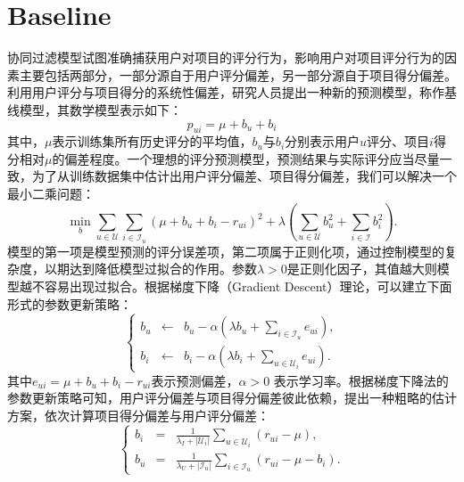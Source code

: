 \section{Baseline}
协同过滤模型试图准确捕获用户对项目的评分行为，影响用户对项目评分行为的因素主要包括两部分，一部分源自于用户评分偏差，另一部分源自于项目得分偏差。利用用户评分与项目得分的系统性偏差，研究人员提出一种新的预测模型，称作基线模型\cite{koren2008factorization,koren2009bellkor,koren2011advances}，其数学模型表示如下：
\begin{equation}\label{eq:baseline}
    p_{ui} = \mu + b_u + b_i
\end{equation}
其中，$\mu$表示训练集所有历史评分的平均值，$b_u$与$b_i$分别表示用户$u$评分、项目$i$得分相对$\mu$的偏差程度。一个理想的评分预测模型，预测结果与实际评分应当尽量一致，为了从训练数据集中估计出用户评分偏差、项目得分偏差，我们可以解决一个最小二乘问题：
\begin{equation}
    \min\limits_{b} \sum\limits_{u\in \mathcal U}\sum\limits_{i\in \mathcal I_u} (\mu + b_u + b_i - r_{ui})^2 + \lambda (\sum\limits_{u\in \mathcal U} b_u^2 + \sum\limits_{i\in \mathcal I} b_i^2).
\end{equation}
模型的第一项是模型预测的评分误差项，第二项属于正则化项，通过控制模型的复杂度，以期达到降低模型过拟合的作用。参数$\lambda>0$是正则化因子，其值越大则模型越不容易出现过拟合。根据梯度下降（Gradient Descent）理论，可以建立下面形式的参数更新策略：
\begin{equation}
    \left\{
        \begin{array}{lcl}
            b_u & \leftarrow & b_u - \alpha (\lambda b_u + \sum\limits_{i\in \mathcal I_u} e_{ui}),\\
            b_i & \leftarrow & b_i - \alpha (\lambda b_i + \sum\limits_{u\in \mathcal U_i} e_{ui}).
        \end{array}
    \right.
\end{equation}
其中$e_{ui}=\mu + b_u + b_i - r_{ui}$表示预测偏差，$\alpha > 0$ 表示学习率。根据梯度下降法的参数更新策略可知，用户评分偏差与项目得分偏差彼此依赖，\cite{koren2011advances}提出一种粗略的估计方案，依次计算项目得分偏差与用户评分偏差：
\begin{equation}
    \left\{
        \begin{array}{lcl}
            b_i &=& \frac{1}{\lambda_I + |\mathcal U_i|}\sum\limits_{u\in \mathcal U_i} (r_{ui} - \mu),\\
            b_u &=& \frac{1}{\lambda_U + |\mathcal I_u|}\sum\limits_{i\in \mathcal I_u} (r_{ui} - \mu - b_i).
        \end{array}
    \right.
\end{equation}

